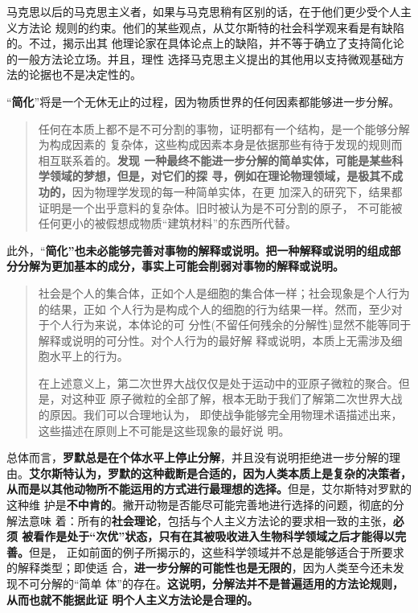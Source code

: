 马克思以后的马克思主义者，如果与马克思稍有区别的话，在于他们更少受个人主义方法论
规则的约束。他们的某些观点，从艾尔斯特的社会科学观来看是有缺陷的。不过，揭示出其
他理论家在具体论点上的缺陷，并不等于确立了支持简化论的一般方法论立场。并且，理性
选择马克思主义提出的其他用以支持微观基础方法的论据也不是决定性的。

“\textbf{简化}”将是一个无休无止的过程，因为物质世界的任何因素都能够进一步分解。
\begin{quotation}
  任何在本质上都不是不可分割的事物，证明都有一个结构，是一个能够分解为构成因素的
  复杂体，这些构成因素本身是依据那些有待于发现的规则而相互联系着的。\textbf{发现
    一种最终不能进一步分解的简单实体，可能是某些科学领域的梦想，但是，对它们的探
    寻，例如在理论物理领域，是极其不成功的，}因为物理学发现的每一种简单实体，在更
  加深入的研究下，结果都证明是一个出乎意料的复杂体。旧时被认为是不可分割的原子，
  不可能被任何更小的被假想成物质“建筑材料”的东西所代替。
\end{quotation}

此外，“\textbf{简化”也未必能够完善对事物的解释或说明。把一种解释或说明的组成部
  分分解为更加基本的成分，事实上可能会削弱对事物的解释或说明。}
\begin{quotation}
  社会是个人的集合体，正如个人是细胞的集合体一样；社会现象是个人行为的结果，正如
  个人行为是构成个人的细胞的行为结果一样。然而，至少对于个人行为来说，本体论的可
  分性(不留任何残余的分解性)显然不能等同于解释或说明的可分性。对个人行为的最好解
  释或说明，本质上无需涉及细胞水平上的行为。

  在上述意义上，第二次世界大战仅仅是处于运动中的亚原子微粒的聚合。但是，对这种亚
  原子微粒的全部了解，根本无助于我们了解第二次世界大战的原因。我们可以合理地认为，
  即使战争能够完全用物理术语描述出来，这些描述在原则上不可能是这些现象的最好说
  明。
\end{quotation}

总体而言，\textbf{罗默总是在个体水平上停止分解}，并且没有说明拒绝进一步分解的理
由。\textbf{艾尔斯特认为，罗默的这种截断是合适的，因为人类本质上是复杂的决策者，
  从而是以其他动物所不能运用的方式进行最理想的选择。}但是，艾尔斯特对罗默的这种维
护是\textbf{不中肯的}。撇开动物是否能尽可能完善地进行选择的问题，彻底的分解法意味
着：所有的\textbf{社会理论}，包括与个人主义方法论的要求相一致的主张，\textbf{必须
  被看作是处于“次优”状态，只有在其被吸收进入生物科学领域之后才能得以完善。}但是，
正如前面的例子所揭示的，这些科学领域并不总是能够适合于所要求的解释类型；即使适
合，\textbf{进一步分解的可能性也是无限的}，因为人类至今还未发现不可分解的“简单
体”的存在。\textbf{这说明，分解法并不是普遍适用的方法论规则，从而也就不能据此证
  明个人主义方法论是合理的。}

